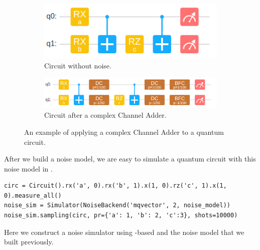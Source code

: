 \begin{figure}
    \centering
    \begin{subfigure}{0.32\textwidth}
        \centering
        \includegraphics[width=\textwidth]{images/3_3_no_complex.png}
        \caption{Circuit without noise.}
    \end{subfigure}
    \begin{subfigure}{0.5\textwidth}
        \centering
        \includegraphics[width=\textwidth]{images/3_3_complex.png}
        \caption{Circuit after a complex Channel Adder.}
    \end{subfigure}
    \caption{An example of applying a complex Channel Adder to a quantum circuit.}
    \label{fig:complex_adder}
\end{figure}

After we build a noise model, we are easy to simulate a quantum circuit with this noise model in \MindQuantum.
\begin{lstlisting}
circ = Circuit().rx('a', 0).rx('b', 1).x(1, 0).rz('c', 1).x(1, 0).measure_all()
noise_sim = Simulator(NoiseBackend('mqvector', 2, noise_model))
noise_sim.sampling(circ, pr={'a': 1, 'b': 2, 'c':3}, shots=10000)
\end{lstlisting}
Here we construct a noise simulator using -based \NoiseBackend and the noise model that we built previously.
